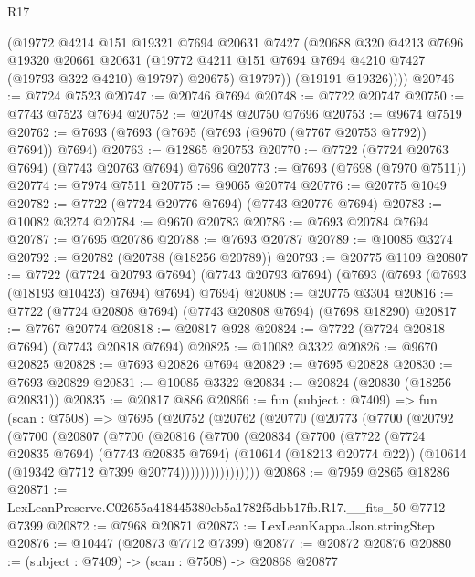 \begin{lexlean}{R17}
\begin{coremodule}
            (@19772
              @4214
              @151
              @19321
              @7694
              @20631
              @7427
              (@20688
                @320
                @4213
                @7696
                @19320
                @20661
                @20631
                (@19772 @4211 @151 @7694 @7694 @4210 @7427 (@19793 @322 @4210) @19797)
                @20675)
              @19797))
          (@19191 @19326))))
@20746 := @7724 @7523
@20747 := @20746 @7694
@20748 := @7722 @20747
@20750 := @7743 @7523 @7694
@20752 := @20748 @20750 @7696
@20753 := @9674 @7519
@20762 := @7693 (@7693 (@7695 (@7693 (@9670 (@7767 @20753 @7792)) @7694)) @7694)
@20763 := @12865 @20753
@20770 := @7722 (@7724 @20763 @7694) (@7743 @20763 @7694) @7696
@20773 := @7693 (@7698 (@7970 @7511))
@20774 := @7974 @7511
@20775 := @9065 @20774
@20776 := @20775 @1049
@20782 := @7722 (@7724 @20776 @7694) (@7743 @20776 @7694)
@20783 := @10082 @3274
@20784 := @9670 @20783
@20786 := @7693 @20784 @7694
@20787 := @7695 @20786
@20788 := @7693 @20787
@20789 := @10085 @3274
@20792 := @20782 (@20788 (@18256 @20789))
@20793 := @20775 @1109
@20807 := @7722
    (@7724 @20793 @7694)
    (@7743 @20793 @7694)
    (@7693 (@7693 (@7693 (@18193 @10423) @7694) @7694) @7694)
@20808 := @20775 @3304
@20816 := @7722 (@7724 @20808 @7694) (@7743 @20808 @7694) (@7698 @18290)
@20817 := @7767 @20774
@20818 := @20817 @928
@20824 := @7722 (@7724 @20818 @7694) (@7743 @20818 @7694)
@20825 := @10082 @3322
@20826 := @9670 @20825
@20828 := @7693 @20826 @7694
@20829 := @7695 @20828
@20830 := @7693 @20829
@20831 := @10085 @3322
@20834 := @20824 (@20830 (@18256 @20831))
@20835 := @20817 @886
@20866 := fun (subject : @7409) =>
  fun (scan : @7508) =>
  @7695
    (@20752
      (@20762
        (@20770
          (@20773
            (@7700
              (@20792
                (@7700
                  (@20807
                    (@7700
                      (@20816
                        (@7700
                          (@20834
                            (@7700
                              (@7722
                                (@7724 @20835 @7694)
                                (@7743 @20835 @7694)
                                (@10614 (@18213 @20774 @22))
                                (@10614 (@19342 @7712 @7399 @20774))))))))))))))))
@20868 := @7959 @2865 @18286
@20871 := LexLeanPreserve.C02655a418445380eb5a1782f5dbb17fb.R17.__fits_50 @7712 @7399
@20872 := @7968 @20871
@20873 := LexLeanKappa.Json.stringStep
@20876 := @10447 (@20873 @7712 @7399)
@20877 := @20872 @20876
@20880 := (subject : @7409) -> (scan : @7508) -> @20868 @20877

\end{coremodule}
\end{lexlean}
